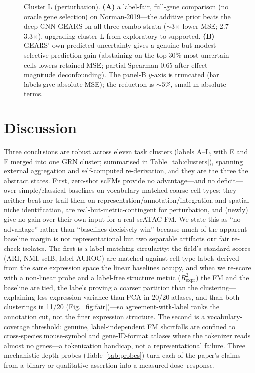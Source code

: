 \documentclass[fleqn,10pt,lineno]{wlpeerj}  %
\newcommand{\fitfig}[1]{\resizebox{\ifdim\width>\linewidth\linewidth\else\width\fi}{!}{#1}}
\begin{document}
\begin{figure}[htb]\centering\fitfig{}
\caption{Cluster L (perturbation). \textbf{(A)} a label-fair, full-gene comparison (no oracle gene selection) on Norman-2019---the additive prior beats the deep GNN GEARS on all three combo strata ($\sim$3$\times$ lower MSE; 2.7--3.3$\times$), upgrading cluster L from exploratory to supported. \textbf{(B)} GEARS' own predicted uncertainty gives a genuine but modest selective-prediction gain (abstaining on the top-30\% most-uncertain cells lowers retained MSE; partial Spearman 0.65 after effect-magnitude deconfounding). The panel-B $y$-axis is truncated (bar labels give absolute MSE); the reduction is ${\sim}5\%$, small in absolute terms.}\label{fig:perturb}\end{figure}



\section{Discussion}

Three conclusions are robust across eleven task clusters (labels A--L, with E and F merged into one GRN cluster; summarised in Table~\ref{tab:clusters}), spanning external aggregation and self-computed re-derivation, and they are the three the abstract states. First, zero-shot scFMs provide no advantage---and no deficit---over simple/classical baselines on vocabulary-matched coarse cell types: they neither beat nor trail them on representation/annotation/integration and spatial niche identification, are real-but-metric-contingent for perturbation, and (newly) give no gain over their own input for a real scATAC FM. We state this as ``no advantage'' rather than ``baselines decisively win'' because much of the apparent baseline margin is not representational but two separable artifacts our fair re-check isolates. The first is a label-matching circularity: the field's standard scores (ARI, NMI, scIB, label-AUROC) are matched against cell-type labels derived from the same expression space the linear baselines occupy, and when we re-score with a non-linear probe and a label-free structure metric ($R^2_{\mathrm{expr}}$) the FM and the baseline are tied, the labels proving a coarser partition than the clustering---explaining less expression variance than PCA in 20/20 atlases, and than both clusterings in 11/20 (Fig.~\ref{fig:fair})---so agreement-with-label ranks the annotation cut, not the finer expression structure. The second is a vocabulary-coverage threshold: genuine, label-independent FM shortfalls are confined to cross-species mouse-symbol and gene-ID-format atlases where the tokenizer reads almost no genes---a tokenization handicap, not a representational failure. Three mechanistic depth probes (Table~\ref{tab:probes}) turn each of the paper's claims from a binary or qualitative assertion into a measured dose--response.
\end{document}
